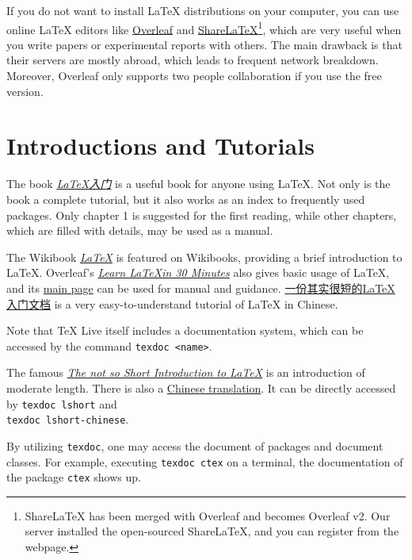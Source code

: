 \documentclass[english]{../TexTemplate/thesis}
\begin{document}
If you do not want to install \LaTeX{} distributions on your computer, you can use online \LaTeX{} editors like \href{https://www.overleaf.com}{Overleaf} and \href{https://www.sharelatex.com/}{ShareLaTeX}\footnote{ShareLaTeX has been merged with Overleaf and becomes Overleaf v2. Our server installed the open-sourced ShareLaTeX, and you can register from the webpage.}, which are very useful when you write papers or experimental reports with others.
The main drawback is that their servers are mostly abroad, which leads to frequent network breakdown.
Moreover, Overleaf only supports two people collaboration if you use the free version.


\section{Introductions and Tutorials}
The book \href{https://item.jd.com/11258469.html}{\emph{\LaTeX 入门}} is a useful book for anyone using \LaTeX. Not only is the book a complete tutorial, but it also works as an index to frequently used packages. Only chapter 1 is suggested for the first reading, while other chapters, which are filled with details, may be used as a manual.

The Wikibook \href{https://en.wikibooks.org/wiki/LaTeX}{\emph{\LaTeX}} is featured on Wikibooks, providing a brief introduction to \LaTeX. Overleaf's \href{https://www.overleaf.com/learn/latex/Learn_LaTeX_in_30_minutes}{\emph{Learn \LaTeX in 30 Minutes}} also gives basic usage of \LaTeX, and its \href{https://www.overleaf.com/learn/latex/Main_Page}{main page} can be used for manual and guidance. \href{https://liam.page/2014/09/08/latex-introduction/}{一份其实很短的\LaTeX{}入门文档} is a very easy-to-understand tutorial of \LaTeX{} in Chinese.

Note that \TeX{} Live itself includes a documentation system, which can be accessed by the command \verb"texdoc <name>".

The famous \href{https://www.ctan.org/tex-archive/info/lshort/english/}{\emph{The not so Short Introduction to \LaTeX}} is an introduction of moderate length. There is also a \href{ https://www.ctan.org/tex-archive/info/lshort/chinese}{Chinese translation}. It can be directly accessed by \verb"texdoc lshort" and\\ \verb"texdoc lshort-chinese".

By utilizing \verb"texdoc", one may access the document of packages and document classes. For example, executing \verb"texdoc ctex" on a terminal, the documentation of the package \verb"ctex" shows up.
\end{document}
